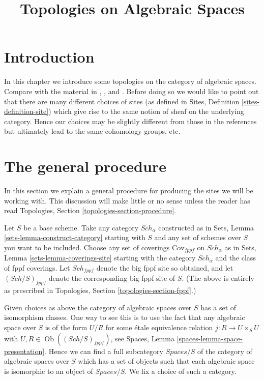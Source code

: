 \documentclass{stacks-project}
\theoremstyle{plain}
\theoremstyle{definition}
\theoremstyle{remark}
\numberwithin{equation}{subsection}
\def\Sch{\mathit{Sch}}
\def\Ob{\mathop{\mathrm{Ob}}\nolimits}
\begin{document}
\title{Topologies on Algebraic Spaces}

\maketitle

\label{section-phantom}

\tableofcontents




\section{Introduction}
\label{section-introduction}

\noindent
In this chapter we introduce some topologies on the
category of algebraic spaces. Compare with the material in \cite{SGA1},
\cite{Ner}, \cite{LM-B} and \cite{Kn}.
Before doing so we would like to point out that there
are many different choices of sites (as defined in
Sites, Definition \ref{sites-definition-site}) which give rise to
the same notion of sheaf on the underlying category. Hence
our choices may be slightly different from those in the references
but ultimately lead to the same cohomology groups, etc.




\section{The general procedure}
\label{section-procedure}

\noindent
In this section we explain a general procedure for producing the
sites we will be working with. This discussion will make little or
no sense unless the reader has read
Topologies, Section \ref{topologies-section-procedure}.

\medskip\noindent
Let $S$ be a base scheme.
Take any category $\Sch_\alpha$ constructed as in
Sets, Lemma \ref{sets-lemma-construct-category} starting with
$S$ and any set of schemes over $S$ you want to be included.
Choose any set of
coverings $\text{Cov}_{fppf}$ on $\Sch_\alpha$ as in
Sets, Lemma \ref{sets-lemma-coverings-site}
starting with the category $\Sch_\alpha$ and the class of fppf
coverings. Let $\Sch_{fppf}$ denote the big fppf site so
obtained, and let $(\Sch/S)_{fppf}$ denote the corresponding
big fppf site of $S$. (The above is entirely as prescribed in Topologies,
Section \ref{topologies-section-fppf}.)

\medskip\noindent
Given choices as above the category of algebraic spaces over $S$
has a set of isomorphism classes. One way to see this is to use the
fact that any algebraic space over $S$ is of the form $U/R$ for
some \'etale equivalence relation $j : R \to U \times_S U$ with
$U, R \in \Ob((\Sch/S)_{fppf})$, see
Spaces, Lemma \ref{spaces-lemma-space-presentation}.
Hence we can find a full subcategory $\textit{Spaces}/S$ of the category of
algebraic spaces over $S$ which has a set of objects
such that each algebraic space is isomorphic to an object of
$\textit{Spaces}/S$. We fix a choice of such a category.
\end{document}
